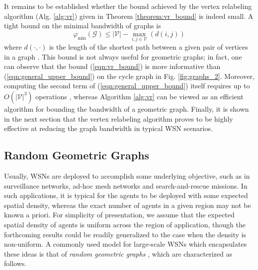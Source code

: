 \documentclass[twocolumn]{article}
\theoremstyle{plain}
\theoremstyle{definition}
\theoremstyle{definition}
\theoremstyle{remark}
\begin{document}
It remains to be established whether the bound achieved by the vertex relabeling algorithm (Alg. \ref{alg:vr}) given in Theorem \ref{theorem:vr_bound} is indeed small. A tight bound on the minimal bandwidth of graphs is 
\begin{equation}
\varphi _{\textrm{min}} (\mathcal G) \leq |\mathcal V| - \max_{i,j \in \mathcal V}\left(\textit{d}(i,j)\right)
\label{eqn:general_upper_bound}
\end{equation}
where $d(\cdot,\cdot)$ is the length of the shortest path between a given pair of vertices in a graph \cite[Th. 3.2.1]{chinn1982bandwidth}. This bound is not always useful for geometric graphs; in fact, one can observe that the bound (\ref{eqn:vr_bound}) is more informative than (\ref{eqn:general_upper_bound}) on the cycle graph in Fig. \ref{fig:graphs_2}. Moreover, computing the second term of (\ref{eqn:general_upper_bound}) itself requires up to $O(|\mathcal V|^3)$ operations \cite[Section 25.2]{cormen2022introduction}, whereas Algorithm \ref{alg:vr} can be viewed as an efficient algorithm for bounding the bandwidth of a geometric graph. Finally, it is shown in the next section that the vertex relabeling algorithm proves to be highly effective at reducing the graph bandwidth in typical WSN scenarios.

\subsection{Random Geometric Graphs}
\label{sec:RandomGraphs}
Usually, WSNs are deployed to accomplish some underlying objective, such as in surveillance networks, ad-hoc mesh networks and search-and-rescue missions. In such applications, it is typical for the agents to be deployed with some expected spatial density, whereas the exact number of agents in a given region may not be known a priori. For simplicity of presentation, we assume that the expected spatial density of agents is uniform across the region of application, though the forthcoming results could be readily generalized to the case when the density is non-uniform. A commonly used model for large-scale WSNs which encapsulates these ideas is that of \textit{random geometric graphs} \cite{2010randomWSN,2010PoissonRGG, dimakis2006geographic}, which are characterized as follows.
\end{document}

